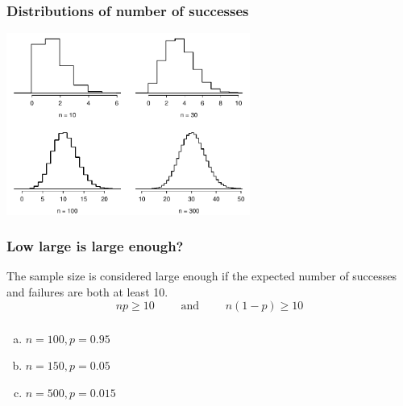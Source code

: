 \begin{frame}
\frametitle{Distributions of number of successes}


\begin{center}
\includegraphics[width=0.60\textwidth]{3-4_binomial_distribution/figures/fourBinomialModelsShowingApproxToNormal/fourBinomialModelsShowingApproxToNormal}
\end{center}

\end{frame}


\begin{frame}
\frametitle{Low large is large enough?}

The sample size is considered large enough if the expected number of successes and failures are both at least 10.
\[ np \ge 10 \qquad \text{ and } \qquad n(1-p) \ge 10 \]


\end{frame}


\begin{frame}
\frametitle{}


\begin{enumerate}[(a)]
\item $n = 100, p = 0.95$
 
\item $n = 150, p = 0.05$
\item $n = 500, p = 0.015$
\end{enumerate}

\end{frame}


